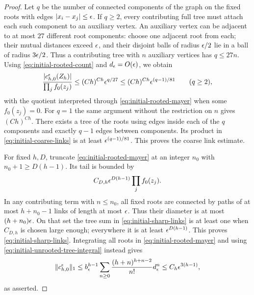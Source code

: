 \begin{proof}
Let $q$ be the number of connected components of the graph on the
fixed roots with edges $|x_i-x_j|\le\epsilon$.  If $q\ge2$, every
contributing full tree must attach each such component to an auxiliary
vertex.  An auxiliary vertex can be adjacent to at most $27$ different
root components: choose one adjacent root from each; their mutual
distances exceed $\epsilon$, and their disjoint balls of radius $\epsilon/2$
lie in a ball of radius $3\epsilon/2$.  Thus a contributing tree with
$n$ auxiliary vertices has $q\le27n$.
Using \eqref{eq:initial-rooted-count} and $d_\epsilon=O(\epsilon)$, we obtain
\[
 \frac{|c_{h,0}^{\epsilon}(Z_h)|}{\prod_j f_0(z_j)}
 \le (Ch)^{Ch}\epsilon^{q/27}
 \le (Ch)^{Ch}\epsilon^{(q-1)/81}\qquad(q\ge2),
\]
with the quotient interpreted through
\eqref{eq:initial-rooted-mayer} when some $f_0(z_j)=0$.
For $q=1$ the same argument without the restriction on $n$ gives
$(Ch)^{Ch}$.  There exists a tree of the roots using edges inside each
of the $q$ components and exactly $q-1$ edges between components.
Its product in \eqref{eq:initial-coarse-links} is at least
$\epsilon^{(q-1)/81}$.  This proves the coarse link estimate.

For fixed $h,D$, truncate \eqref{eq:initial-rooted-mayer} at an integer
$n_0$ with $n_0+1\ge D(h-1)$.  Its tail is bounded by
\[
 C_{D,h}\epsilon^{D(h-1)}\prod_j f_0(z_j).
\]
In any contributing term
with $n\le n_0$, all fixed roots are connected by paths of at most
$h+n_0-1$ links of length at most $\epsilon$.  Thus their diameter is at
most $(h+n_0)\epsilon$.  On that set the tree sum in
\eqref{eq:initial-sharp-links} is at least one when $C_{D,h}$ is chosen
large enough; everywhere it is at least $\epsilon^{D(h-1)}$.
This proves \eqref{eq:initial-sharp-links}.  Integrating all roots in
\eqref{eq:initial-rooted-mayer} and using
\eqref{eq:initial-unrooted-tree-integral} instead gives
\[
 \|c_{h,0}^{\epsilon}\|_1
 \le b_\epsilon^{h-1}
       \sum_{n\ge0}\frac{(h+n)^{h+n-2}}{n!}d_\epsilon^n
 \le C_h\epsilon^{3(h-1)},
\]
as asserted.


\end{proof}

